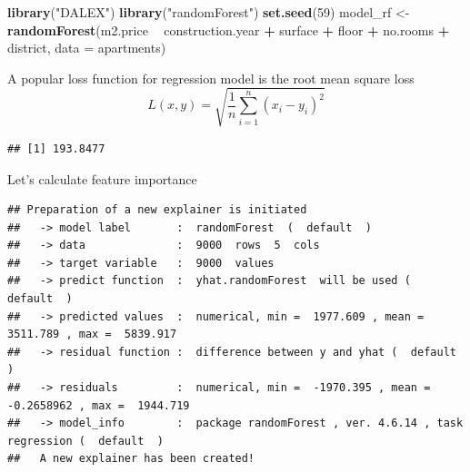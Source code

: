 \documentclass[12pt,]{krantz}
\newenvironment{Shaded}{\begin{snugshade}}{\end{snugshade}}
\newcommand{\DataTypeTok}[1]{\textcolor[rgb]{0.13,0.29,0.53}{#1}}
\newcommand{\DecValTok}[1]{\textcolor[rgb]{0.00,0.00,0.81}{#1}}
\newcommand{\KeywordTok}[1]{\textcolor[rgb]{0.13,0.29,0.53}{\textbf{#1}}}
\newcommand{\NormalTok}[1]{#1}
\newcommand{\OperatorTok}[1]{\textcolor[rgb]{0.81,0.36,0.00}{\textbf{#1}}}
\newcommand{\OtherTok}[1]{\textcolor[rgb]{0.56,0.35,0.01}{#1}}
\newcommand{\StringTok}[1]{\textcolor[rgb]{0.31,0.60,0.02}{#1}}
\begin{document}
\begin{Shaded}
\begin{Highlighting}[]
\KeywordTok{library}\NormalTok{(}\StringTok{"DALEX"}\NormalTok{)}
\KeywordTok{library}\NormalTok{(}\StringTok{"randomForest"}\NormalTok{)}
\KeywordTok{set.seed}\NormalTok{(}\DecValTok{59}\NormalTok{)}
\NormalTok{model_rf <-}\StringTok{ }\KeywordTok{randomForest}\NormalTok{(m2.price }\OperatorTok{~}\StringTok{ }\NormalTok{construction.year }\OperatorTok{+}\StringTok{ }\NormalTok{surface }\OperatorTok{+}\StringTok{ }\NormalTok{floor }\OperatorTok{+}\StringTok{ }
\StringTok{                           }\NormalTok{no.rooms }\OperatorTok{+}\StringTok{ }\NormalTok{district, }\DataTypeTok{data =}\NormalTok{ apartments)}
\end{Highlighting}
\end{Shaded}

A popular loss function for regression model is the root mean square loss
\[
  L(x, y) = \sqrt{\frac1n \sum_{i=1}^n (x_i - y_i)^2}
\]

\begin{Shaded}
\end{Shaded}

\begin{verbatim}
## [1] 193.8477
\end{verbatim}

Let's calculate feature importance

\begin{Shaded}
\end{Shaded}

\begin{verbatim}
## Preparation of a new explainer is initiated
##   -> model label       :  randomForest  (  default  )
##   -> data              :  9000  rows  5  cols 
##   -> target variable   :  9000  values 
##   -> predict function  :  yhat.randomForest  will be used (  default  )
##   -> predicted values  :  numerical, min =  1977.609 , mean =  3511.789 , max =  5839.917  
##   -> residual function :  difference between y and yhat (  default  )
##   -> residuals         :  numerical, min =  -1970.395 , mean =  -0.2658962 , max =  1944.719  
##   -> model_info        :  package randomForest , ver. 4.6.14 , task regression (  default  ) 
##   A new explainer has been created!
\end{verbatim}
\end{document}

